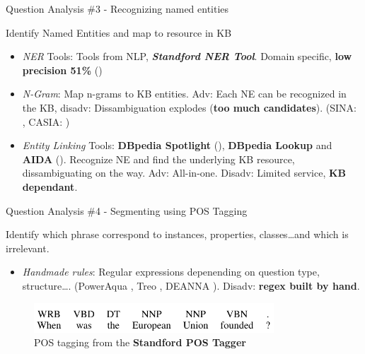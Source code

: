 \documentclass{beamer}
\begin{document}
\begin{frame}{Question Analysis \#3 - Recognizing named entities}
  \begin{card}
    Identify Named Entities and map to resource in KB
    \begin{itemize}
      \item \textit{NER} Tools: Tools from NLP, \textbf{\textit{Standford NER Tool}}. Domain specific, \textbf{low precision 51\%} (\cite{he2014a})
      \item \textit{N-Gram}: Map n-grams to KB entities. Adv: Each NE can be recognized in the KB, disadv: Dissambiguation explodes (\textbf{too much candidates}). (SINA: \cite{shekarpour2015a}, CASIA: \cite{he2014a})
      \item \textit{Entity Linking} Tools: \textbf{DBpedia Spotlight} (\cite{daiber2013a}), \textbf{DBpedia Lookup} and \textbf{AIDA} (\cite{yosef2011a}). Recognize NE and find the underlying KB resource, dissambiguating on the way. Adv: All-in-one. Disadv: Limited service, \textbf{KB dependant}.
    \end{itemize}
  \end{card}
\end{frame}


\begin{frame}{Question Analysis \#4 - Segmenting using POS Tagging}
  \begin{card}
    Identify which phrase correspond to instances, properties, classes\dots and which is irrelevant.
    \begin{itemize}
      \item \textit{Handmade rules}: Regular expressions depenending on question type, structure\dots. (PowerAqua \cite{lopez2012a}, Treo \cite{freitas2014a}, DEANNA \cite{yahya2013a}). Disadv: \textbf{regex built by hand}.
    \end{itemize}
    \begin{figure}\label{fig:pos_tagging}
      \centering
      \includegraphics[width=0.8\textwidth]{./res/pos.png}
      \caption{POS tagging from the \textbf{Standford POS Tagger}}
    \end{figure}
  \end{card}
\end{frame}
\end{document}
